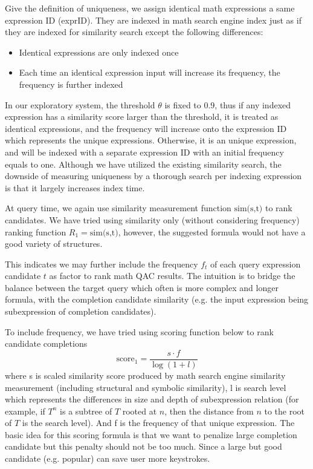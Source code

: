 \documentclass[12pt]{article} %
\begin{document}
Give the definition of uniqueness, we assign identical math expressions a same expression ID (exprID). They are indexed in math search engine index just as if they are indexed for similarity search except the following differences:
\begin{itemize}
\item Identical expressions are only indexed once
\item Each time an identical expression input will increase its frequency, the frequency is further
indexed
\end{itemize}

In our exploratory system, the threshold $\theta$ is fixed to 0.9,
thus if any indexed expression has a similarity score larger than
the threshold, it is treated as identical expressions, and the frequency will
increase onto the expression ID which represents the unique expressions.
Otherwise, it is an unique expression, and will be indexed with a separate
expression ID with an initial frequency equals to one.
Although we have utilized the existing similarity search, the
downside of measuring uniqueness by a thorough search per indexing
expression is that it largely increases index time.

At query time, we again use similarity measurement function $\text{sim(s,t)}$ 
to rank candidates.
We have tried using similarity only (without considering frequency) ranking function $R_1 = \text{sim(s,t)}$, however, the suggested formula would not have a good variety of structures.

This indicates we may further include the frequency $f_t$ of
each query expression candidate $t$ as factor to rank math QAC results.
The intuition is to bridge the balance between the target query which often
is more complex and longer formula,
with the completion candidate similarity (e.g. the input expression being subexpression of completion candidates).

To include frequency, we have tried using scoring function below to rank candidate completions
$$
\text{score}_1 = \frac{s \cdot f}{\log(1 + l)}
$$
where s is scaled similarity score produced by math search engine similarity
measurement (including structural and symbolic similarity), l is search level
which represents the differences in size and depth of subexpression relation (for example, if $T^n$ is a subtree of $T$ rooted at $n$, then the distance from $n$ to the root of $T$ is the search level).
And f is the frequency of that unique expression.
The basic idea for this scoring formula is that we want to penalize 
large completion candidate but this penalty should not be too much.
Since a large but good candidate (e.g. popular) can save user more
keystrokes.
\end{document}
